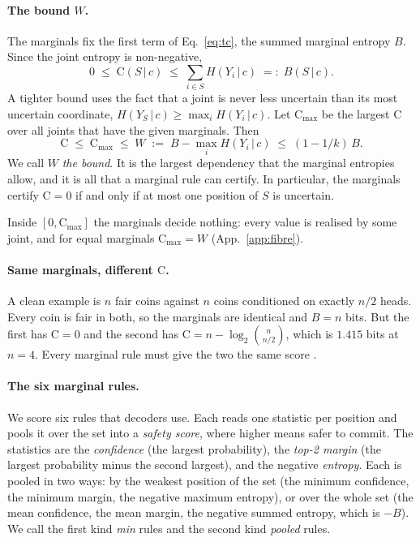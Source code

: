 \documentclass{article}
\newcommand{\C}{\mathrm{C}}
\newcommand{\given}{\,\vert\,}
\begin{document}
\paragraph{The bound $W$.} The marginals fix the first term of Eq.~\eqref{eq:tc}, the
summed marginal entropy $B$. Since the joint entropy is non-negative,
\begin{equation}
  0 \;\le\; \C(S\given c) \;\le\; \sum_{i\in S} H(Y_i\given c) \;=:\; B(S\given c).
  \label{eq:budget}
\end{equation}
A tighter bound uses the fact that a joint is never less uncertain than its most
uncertain coordinate, $H(Y_S\given c)\ge\max_i H(Y_i\given c)$. Let $\C_{\max}$ be the
largest $\C$ over all joints that have the given marginals. Then
\begin{equation}
  \C \;\le\; \C_{\max} \;\le\; W \;:=\; B-\max_i H(Y_i\given c) \;\le\; (1-1/k)\,B .
  \label{eq:width}
\end{equation}
We call $W$ \emph{the bound}. It is the largest dependency that the marginal entropies
allow, and it is all that a marginal rule can certify. In particular, the marginals
certify $\C=0$ if and only if at most one position of $S$ is uncertain.

Inside $[0,\C_{\max}]$ the marginals decide nothing: every value is realised by some
joint, and for equal marginals $\C_{\max}=W$ (App.~\ref{app:fibre}).

\paragraph{Same marginals, different $\C$.} A clean example is $n$ fair coins against
$n$ coins conditioned on exactly $n/2$ heads. Every coin is fair in both, so the
marginals are identical and $B=n$ bits. But the first has $\C=0$ and the second has
$\C=n-\log_2\binom{n}{n/2}$, which is $1.415$ bits at $n{=}4$. Every marginal rule must
give the two the same score \cite{marginalsmatch}.

\paragraph{The six marginal rules.} We score six rules that decoders use. Each reads
one statistic per position and pools it over the set into a \emph{safety score}, where
higher means safer to commit. The statistics are the \emph{confidence} (the largest
probability), the \emph{top-2 margin} (the largest probability minus the second
largest), and the negative \emph{entropy}. Each is pooled in two ways: by the weakest
position of the set (the minimum confidence, the minimum margin, the negative maximum
entropy), or over the whole set (the mean confidence, the mean margin, the negative
summed entropy, which is $-B$). We call the first kind \emph{min} rules and the second
kind \emph{pooled} rules.
\end{document}
